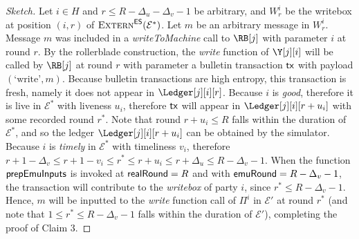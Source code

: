 \begin{proof}[Sketch]
  Let $i \in H$ and $r \leq R - \Delta_u - \Delta_v - 1$ be arbitrary, and $W^i_r$ be the writebox
  at position $(i, r)$ of $\textsc{Extern}^{\textsf{ES}}(\mathcal{E}^*)$. Let $m$ be an arbitrary message
  in $W^i_r$. Message $m$ was included in a \emph{writeToMachine} call to $\RB[j]$
  with parameter $i$ at round $r$. By the rollerblade construction, the \emph{write}
  function of $\Y[j][i]$ will be called by $\RB[j]$ at round $r$ with parameter a bulletin
  transaction $\textsf{tx}$ with payload $(\text{`write'}, m)$. Because bulletin transactions are high entropy,
  this transaction is fresh, namely it does not appear in $\Ledger[j][i][r]$.
  Because $i$ is \emph{good}, therefore it is live in $\mathcal{E}^*$ with liveness $u_i$,
  therefore $\textsf{tx}$ will appear in $\Ledger[j][i][r + u_i]$ with some recorded round $r^*$.
  Note that round $r + u_i \leq R$ falls within the duration of $\mathcal{E}^*$, and
  so the ledger $\Ledger[j][i][r + u_i]$ can be obtained by the simulator.
  Because $i$ is \emph{timely} in $\mathcal{E}^*$ with timeliness $v_i$, therefore
  $r + 1 - \Delta_v \leq r + 1 - v_i \leq r^* \leq r + u_i \leq r + \Delta_u \leq R - \Delta_v - 1$.
  When the function $\textsf{prepEmuInputs}$ is invoked at $\textsf{realRound} = R$
  and with $\textsf{emuRound} = R - \Delta_v - 1$, the transaction will contribute
  to the \emph{writebox} of party $i$, since $r^* \leq R - \Delta_v - 1$.
  Hence, $m$ will be inputted to the \emph{write} function call of $\Pi^i$
  in $\mathcal{E}'$ at round $r^*$ (and note that $1 \leq r^* \leq R - \Delta_v - 1$ falls
  within the duration of $\mathcal{E}'$), completing the proof of Claim 3.
  \Qed
\end{proof}
